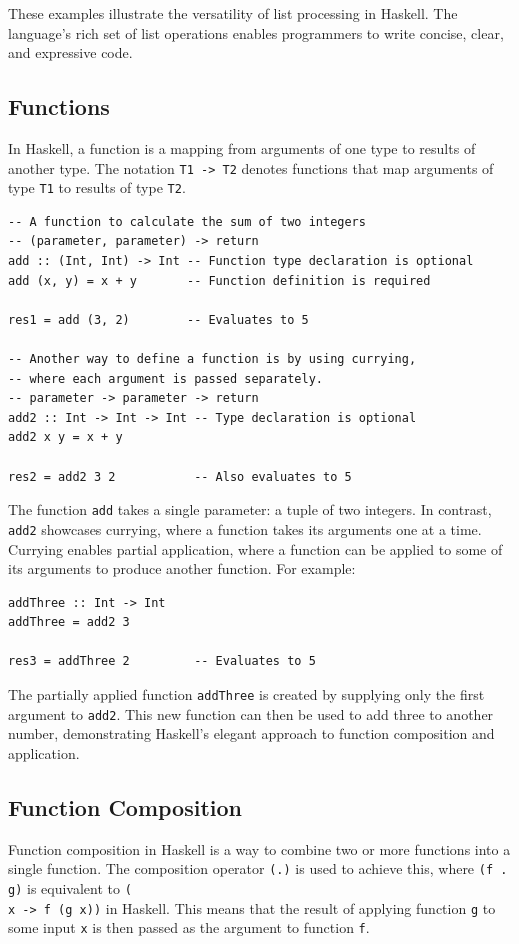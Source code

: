 \documentclass[a4paper, 10pt]{article}
\begin{document}
            These examples illustrate the versatility of list processing in Haskell. The language's rich set of list operations enables programmers to write concise, clear, and expressive code.



    \subsection{Functions}

        In Haskell, a function is a mapping from arguments of one type to results of another type. The notation \texttt{T1 -> T2} denotes functions that map arguments of type \texttt{T1} to results of type \texttt{T2}.

        \lstset{language=Haskell}
        \begin{lstlisting}
-- A function to calculate the sum of two integers
-- (parameter, parameter) -> return
add :: (Int, Int) -> Int -- Function type declaration is optional
add (x, y) = x + y       -- Function definition is required

res1 = add (3, 2)        -- Evaluates to 5

-- Another way to define a function is by using currying,
-- where each argument is passed separately.
-- parameter -> parameter -> return
add2 :: Int -> Int -> Int -- Type declaration is optional
add2 x y = x + y

res2 = add2 3 2           -- Also evaluates to 5
        \end{lstlisting}

        The function \texttt{add} takes a single parameter: a tuple of two integers. In contrast, \texttt{add2} showcases currying, where a function takes its arguments one at a time. Currying enables partial application, where a function can be applied to some of its arguments to produce another function. For example:

        \begin{lstlisting}
addThree :: Int -> Int
addThree = add2 3

res3 = addThree 2         -- Evaluates to 5
        \end{lstlisting}

        The partially applied function \texttt{addThree} is created by supplying only the first argument to \texttt{add2}. This new function can then be used to add three to another number, demonstrating Haskell's elegant approach to function composition and application.


        \subsection{Function Composition}
            Function composition in Haskell is a way to combine two or more functions into a single function. The composition operator \texttt{(.)} is used to achieve this, where \texttt{(f . g)} is equivalent to \texttt{(\\x -> f (g x))} in Haskell. This means that the result of applying function \texttt{g} to some input \texttt{x} is then passed as the argument to function \texttt{f}.
\end{document}
